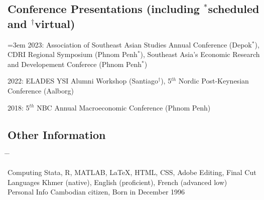 \documentclass[10pt,a4paper]{article}
\newcommand{\tabbedblock}[1]{

	\begin{tabbing}
		\hspace{3cm} \= \hspace{4cm} \= \kill
		#1
	\end{tabbing}
}
\begin{document}
\subsection*{Conference Presentations (including $^\ast$scheduled and $^\dag$virtual)}

\hangindent=3em
	2023:  Association of Southeast Asian Studies Annual Conference (Depok$^\ast$), CDRI Regional Symposium (Phnom Penh$^\ast$), Southeast Asia's Economic Research and Developement Conferece (Phnom Penh$^\ast$)
	
	
	2022:  ELADES YSI Alumni Workshop (Santiago$^\dag$), 5$^{th}$ Nordic Post-Keynesian Conference (Aalborg)

	2018: 5$^{th}$ NBC Annual Macroeconomic Conference (Phnom Penh)


\subsection*{Other Information}

\tabbedblock{
	Computing \> Stata, R, MATLAB, \LaTeX, HTML, CSS,  Adobe Editing, Final Cut\\

	Languages \> Khmer (native), English (proficient), French (advanced low)\\
	
	Personal Info \> Cambodian citizen, Born in December 1996
}

\end{document}
